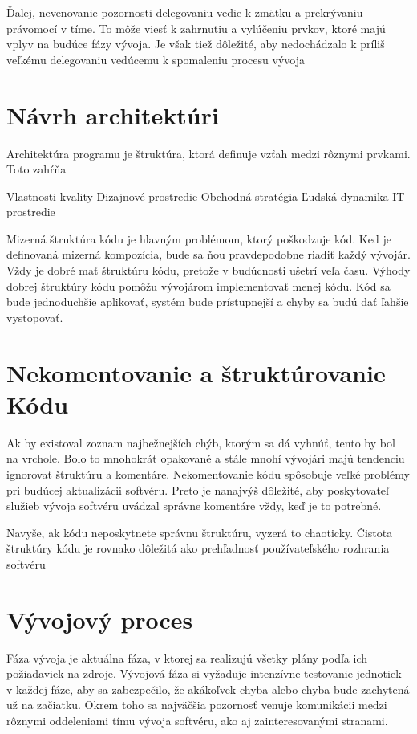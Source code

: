 \documentclass[10pt,twoside,slovak,a4paper]{article}
\begin{document}
Ďalej, nevenovanie pozornosti delegovaniu vedie k zmätku a prekrývaniu právomocí v tíme. To môže viesť k zahrnutiu a vylúčeniu prvkov, ktoré majú vplyv na budúce fázy vývoja. Je však tiež dôležité, aby nedochádzalo k príliš veľkému delegovaniu vedúcemu k spomaleniu procesu vývoja













\section{Návrh architektúri}
Architektúra programu je štruktúra, ktorá definuje vzťah medzi rôznymi prvkami. Toto zahŕňa

Vlastnosti kvality
Dizajnové prostredie
Obchodná stratégia
Ľudská dynamika
IT prostredie

Mizerná štruktúra kódu je hlavným problémom, ktorý poškodzuje kód. Keď je definovaná mizerná kompozícia, bude sa ňou pravdepodobne riadiť každý vývojár. Vždy je dobré mať štruktúru kódu, pretože v budúcnosti ušetrí veľa času. Výhody dobrej štruktúry kódu pomôžu vývojárom implementovať menej kódu. Kód sa bude jednoduchšie aplikovať, systém bude prístupnejší a chyby sa budú dať ľahšie vystopovať.

\section{Nekomentovanie a štruktúrovanie Kódu}

Ak by existoval zoznam najbežnejších chýb, ktorým sa dá vyhnúť, tento by bol na vrchole. Bolo to mnohokrát opakované a stále mnohí vývojári majú tendenciu ignorovať štruktúru a komentáre. Nekomentovanie kódu spôsobuje veľké problémy pri budúcej aktualizácii softvéru. Preto je nanajvýš dôležité, aby poskytovateľ služieb vývoja softvéru uvádzal správne komentáre vždy, keď je to potrebné.

Navyše, ak kódu neposkytnete správnu štruktúru, vyzerá to chaoticky. Čistota štruktúry kódu je rovnako dôležitá ako prehľadnosť používateľského rozhrania softvéru












\section{Vývojový proces}
Fáza vývoja je aktuálna fáza, v ktorej sa realizujú všetky plány podľa ich požiadaviek na zdroje. Vývojová fáza si vyžaduje intenzívne testovanie jednotiek v každej fáze, aby sa zabezpečilo, že akákoľvek chyba alebo chyba bude zachytená už na začiatku. Okrem toho sa najväčšia pozornosť venuje komunikácii medzi rôznymi oddeleniami tímu vývoja softvéru, ako aj zainteresovanými stranami.
\end{document}
